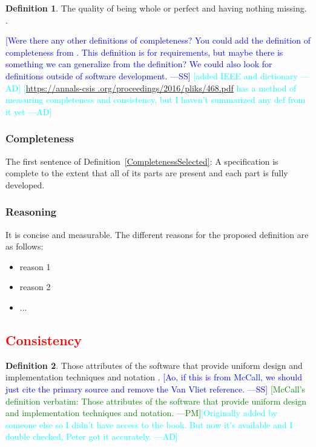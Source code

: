 \documentclass[letterpaper, cleveref]{lipics-v2019}
\newcommand{\authornote}[3]{\textcolor{#1}{[#3 ---#2]}}
\newcommand{\authornote}[3]{}
\newcommand{\wss}[1]{\authornote{blue}{SS}{#1}} %
\newcommand{\pmi}[1]{\authornote{green}{PM}{#1}} %
\newcommand{\ad}[1]{\authornote{cyan}{AD}{#1}} %
\newcommand{\notdone}[1]{\textcolor{red}{#1}}
\theoremstyle{definition}
\newtheorem{defn}{Definition}
\begin{document}
\begin{defn}
The quality of being whole or perfect and having nothing missing.
\citep{CambridgeCompleteness2019}.
\end{defn}

\wss{Were there any other definitions of completeness?  You could add the
definition of completeness from \citet[p.\ 5--6]{IEEE1998}.  This definition
is for requirements, but maybe there is something we can generalize from the
definition?  We could also look for definitions outside of software
development.} \ad{added IEEE and dictionary} \ad{\url{https://annals-csis
.org/proceedings/2016/pliks/468.pdf} has a method of measuring completeness
and consistency, but I haven't summarized any def from it yet}

\begin{mybox}
\subsubsection*{Completeness} 
The first sentence of Definition~\ref{CompletenessSelected}: A specification is
complete to the extent that all of its parts are present and each part is fully
developed.
\end{mybox}

\subsubsection*{Reasoning}

It is concise and measurable.  The different reasons for the proposed definition
are as follows:

\begin{itemize}
  \item reason 1
  \item reason 2
  \item ...
\end{itemize}


\subsection{\notdone{Consistency}} %

\begin{defn}
  Those attributes of the software that provide uniform design and
  implementation techniques and notation \citep{McCallEtAl1977}.  \wss{Ao,
    if this is from McCall, we should just cite the primary source and
    remove the Van Vliet reference.} \pmi{McCall's definition verbatim:
  Those attributes of the software that provide uniform design and
  implementation techniques and notation.}\ad{Originally added by someone
  else so I didn't have access to the book. But now it's available and I
  double checked, Peter got it accurately.}
\end{defn}
\end{document}
